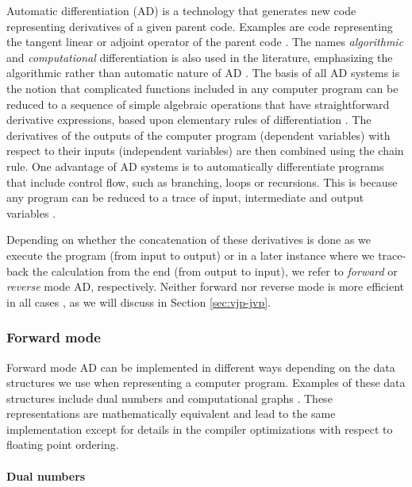 Automatic differentiation (AD) is a technology that generates new code representing derivatives of a given parent code. 
Examples are code representing the tangent linear or adjoint operator of the parent code
\cite{Griewank:2008kh}. 
The names \textit{algorithmic} and \textit{computational} differentiation is also used in the literature, emphasizing the algorithmic rather than automatic nature of AD \cite{Griewank:2008kh, Naumann.2011, Margossian_2018}. 
The basis of all AD systems is the notion that complicated functions included in any computer program can be reduced to a sequence of simple algebraic operations that have straightforward derivative expressions, based upon elementary rules of differentiation \cite{juedes1991taxonomy}.
The derivatives of the outputs of the computer program (dependent variables) with respect to their inputs (independent variables) are then combined using the chain rule.
One advantage of AD systems is to automatically differentiate programs that include control flow, such as branching, loops or recursions. 
This is because any program can be reduced to a trace of input, intermediate and output variables \cite{Baydin_Pearlmutter_Radul_Siskind_2015}.

Depending on whether the concatenation of these derivatives is done as we execute the program (from input to output) or in a later instance where we trace-back the calculation from the end (from output to input), we refer to \textit{forward} or \textit{reverse} mode AD, respectively.
Neither forward nor reverse mode is more efficient in all cases \cite{Griewank_1989}, as we will discuss in Section \ref{sec:vjp-jvp}.

\subsubsection{Forward mode}

Forward mode AD can be implemented in different ways depending on the data structures we use when representing a computer program. 
Examples of these data structures include dual numbers and computational graphs \cite{Baydin_Pearlmutter_Radul_Siskind_2015}. 
These representations are mathematically equivalent and lead to the same implementation except for details in the compiler optimizations with respect to floating point ordering.

\paragraph{Dual numbers}
\label{section:dual-numbers}

